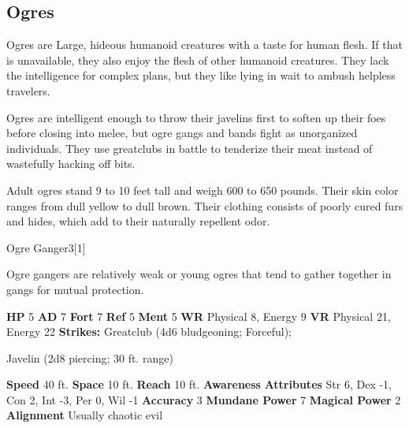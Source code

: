     \subsection{Ogres}
      
      Ogres are Large, hideous humanoid creatures with a taste for human flesh.
      If that is unavailable, they also enjoy the flesh of other humanoid creatures.
      They lack the intelligence for complex plans, but they like lying in wait to ambush helpless travelers.
    
      Ogres are intelligent enough to throw their javelins first to soften up their foes before closing into melee, but ogre gangs and bands fight as unorganized individuals.
      They use greatclubs in battle to tenderize their meat instead of wastefully hacking off bits.

      Adult ogres stand 9 to 10 feet tall and weigh 600 to 650 pounds.
      Their skin color ranges from dull yellow to dull brown.
      Their clothing consists of poorly cured furs and hides, which add to their naturally repellent odor.
    

      
  \begin{monsubsection}{Ogre Ganger}{3}[1]
    \vspace{-1em}\vspace{-1em}
    \vspace{0em}

    
          Ogre gangers are relatively weak or young ogres that tend to gather together in gangs for mutual protection.
        

    \begin{spellcontent}
      \begin{spelltargetinginfo}
        \pari \textbf{HP} 5 \monsep
          \textbf{AD} 7 \monsep
          \textbf{Fort} 7 \monsep
          \textbf{Ref} 5 \monsep
          \textbf{Ment} 5
        \pari \textbf{WR} Physical 8, Energy 9 \monsep
        \textbf{VR} Physical 21, Energy 22
        \pari \textbf{Strikes:}
            Greatclub  (4d6 bludgeoning; Forceful);
\par Javelin  (2d8 piercing; 30 ft. range)
      \end{spelltargetinginfo}
    \end{spellcontent}
    \begin{monsterfooter}
      \pari \textbf{Speed} 40 ft. \monsep
        \textbf{Space} 10 ft. \monsep
        \textbf{Reach} 10 ft.
      \pari \textbf{Awareness} 
      \pari \textbf{Attributes}
        Str 6, Dex -1,
        Con 2, Int -3,
        Per 0, Wil -1
      \pari \textbf{Accuracy} 3 \monsep
        \textbf{Mundane Power} 7 \monsep
      \textbf{Magical Power} 2
      \pari \textbf{Alignment} Usually chaotic evil
    \end{monsterfooter}
  \end{monsubsection}
  
